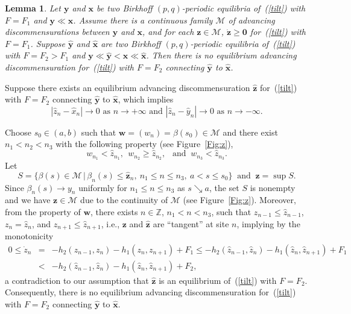 \documentclass[12pt]{article}
\newcommand{\Z}{\mathbb{Z}}
\newcounter{number}
\newtheorem{lemma}{Lemma}
\newcommand{\begle}{\begin{lemma}\hspace{1em}}
\newcommand{\ele}{\end{lemma}
                       \addtocounter{number}{1}}
\newcommand{\emark}{\hfill\hspace{1em}\framebox[0.5em]{\rule{0cm}{0em}}
\vspace{2mm}}
\newcommand{\refer}[1]{~(\ref{#1})}
\newcommand{\wbf}{{\mathbf{w}}}
\newcommand{\zbf}{{\mathbf{z}}}
\newcommand{\xbf}{{\mathbf{x}}}
\newcommand{\ybf}{{\mathbf{y}}}
\newcommand{\zero}{{\mathbf{0}}}
\newcommand{\pf}{{\bf Proof:}\hspace{1em}}
\begin{document}
\begle\label{tangency}
Let $\ybf$ and $\xbf$ be two Birkhoff $(p,q)$-periodic equilibria of\refer{tilt} with $F=F_1$ and $\ybf\ll\xbf$. Assume there is a continuous family $\mathcal{M}$ of advancing discommensurations between $\ybf$ and $\xbf$, and for each $\zbf\in\mathcal{M}$, $\dot{\zbf}\geq \zero$ for\refer{tilt} with $F=F_1$. Suppose $\hat{\ybf}$ and $\hat{\xbf}$ are two Birkhoff $(p,q)$-periodic equilibria of\refer{tilt} with $F=F_2>F_1$ and
$\ybf\ll\hat{\ybf}<\xbf\ll\hat{\xbf}$. Then there is no equilibrium advancing discommensuration for\refer{tilt} with $F=F_2$ connecting $\hat{\ybf}$ to $\hat{\xbf}$.
\ele
\noindent\pf
Suppose there exists an equilibrium advancing discommensuration $\hat{\zbf}$ for\refer{tilt} with $F=F_2$ connecting $\hat{\ybf}$ to $\hat{\xbf}$, which implies
$$
|\hat{z}_n-\hat{x}_n|\to 0 \mbox{ as }n\to +\infty \mbox{ and }
|\hat{z}_n-\hat{y}_n|\to 0 \mbox{ as }n\to -\infty.
$$

Choose $s_0\in (a,b)$ such that $\wbf=(w_n)=\beta(s_0)\in\mathcal{M}$ and there exist $n_1<n_2<n_3$ with the following property (see Figure~\ref{Fig:z}),
$$
w_{n_1}<\hat{z}_{n_1},\ \  w_{n_2}\geq\hat{z}_{n_2}, \ \ \mbox{ and }\ w_{n_3}<\hat{z}_{n_3}.
$$
Let
$$
S=\{\beta(s)\in\mathcal{M}\,|\,\beta_n(s)\leq \hat{\zbf}_n,\ n_1\leq n\leq n_3,\ a<s\leq s_0\} \ \mbox{ and }\ \zbf=\sup S.
$$
Since $\beta_n(s)\to y_n$ uniformly for $n_1\leq n\leq n_3$ as $s\searrow a$,  the set
$S$ is nonempty and we have $\zbf\in\mathcal{M}$ due to the continuity of $\mathcal{M}$ (see Figure~\ref{Fig:z}). Moreover, from the property of $\wbf$, there exists $n\in\Z$, $n_1<n<n_3$,  such that $z_{n-1}\leq\hat{z}_{n-1}$, $z_n=\hat{z}_n$, and $z_{n+1}\leq \hat{z}_{n+1}$, i.e., $\zbf$ and $\hat{\zbf}$ are ``tangent'' at site $n$,  implying by the monotonicity
$$
\begin{array}{lll}
0\leq \dot{z}_n& = & -h_2(z_{n-1},z_n)-h_1(z_n,z_{n+1})+F_1\leq -h_2(\hat{z}_{n-1},\hat{z}_n)-h_1(\hat{z}_n,\hat{z}_{n+1})+F_1\\[4pt]
& < & -h_2(\hat{z}_{n-1},\hat{z}_n)-h_1(\hat{z}_n,\hat{z}_{n+1})+F_2,
\end{array}
$$
a contradiction to our assumption that  $\hat{\zbf}$ is an equilibrium of\refer{tilt} with $F=F_2$. Consequently, there is no equilibrium advancing discommensuration for\refer{tilt} with $F=F_2$ connecting $\hat{\ybf}$ to $\hat{\xbf}$.\emark
\end{document}
